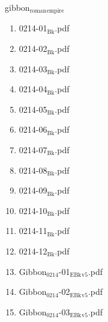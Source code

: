\documentclass[11pt]{article}
\begin{document}

\item gibbon$_{\text{roman}}$$_{\text{empire}}$
\label{sec-1-1-1-1-24-4}
\begin{enumerate}
\item 0214-01$_{\text{Bk}}$.pdf
\label{sec-1-1-1-1-24-4-1}

\item 0214-02$_{\text{Bk}}$.pdf
\label{sec-1-1-1-1-24-4-2}

\item 0214-03$_{\text{Bk}}$.pdf
\label{sec-1-1-1-1-24-4-3}

\item 0214-04$_{\text{Bk}}$.pdf
\label{sec-1-1-1-1-24-4-4}

\item 0214-05$_{\text{Bk}}$.pdf
\label{sec-1-1-1-1-24-4-5}

\item 0214-06$_{\text{Bk}}$.pdf
\label{sec-1-1-1-1-24-4-6}

\item 0214-07$_{\text{Bk}}$.pdf
\label{sec-1-1-1-1-24-4-7}

\item 0214-08$_{\text{Bk}}$.pdf
\label{sec-1-1-1-1-24-4-8}

\item 0214-09$_{\text{Bk}}$.pdf
\label{sec-1-1-1-1-24-4-9}

\item 0214-10$_{\text{Bk}}$.pdf
\label{sec-1-1-1-1-24-4-10}

\item 0214-11$_{\text{Bk}}$.pdf
\label{sec-1-1-1-1-24-4-11}

\item 0214-12$_{\text{Bk}}$.pdf
\label{sec-1-1-1-1-24-4-12}

\item Gibbon$_{\text{0214}}$-01$_{\text{EBk}}$$_{\text{v5}}$.pdf
\label{sec-1-1-1-1-24-4-13}

\item Gibbon$_{\text{0214}}$-02$_{\text{EBk}}$$_{\text{v5}}$.pdf
\label{sec-1-1-1-1-24-4-14}

\item Gibbon$_{\text{0214}}$-03$_{\text{EBk}}$$_{\text{v5}}$.pdf
\label{sec-1-1-1-1-24-4-15}


\end{enumerate}
\end{document}

